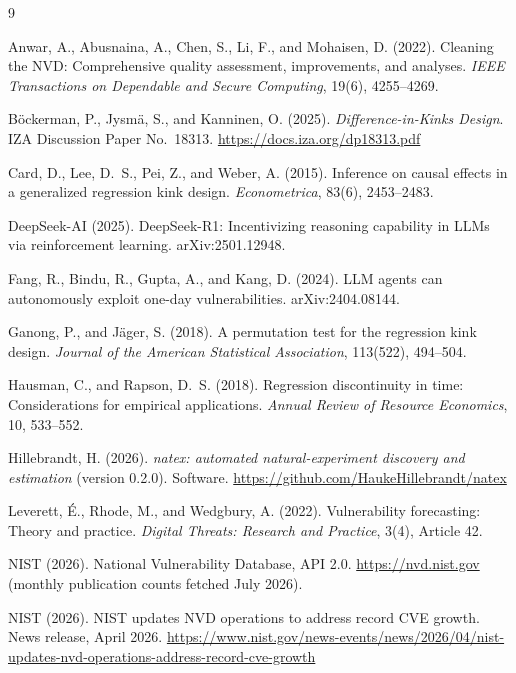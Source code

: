 \documentclass[11pt]{article}
\begin{document}
\footnotesize
\begin{thebibliography}{9}
\setlength{\itemsep}{2pt}\setlength{\parskip}{0pt}

Anwar, A., Abusnaina, A., Chen, S., Li, F., and Mohaisen, D. (2022).
Cleaning the NVD: Comprehensive quality assessment, improvements, and
analyses.
\emph{IEEE Transactions on Dependable and Secure Computing}, 19(6),
4255--4269.

B\"ockerman, P., Jysm\"a, S., and Kanninen, O. (2025).
\emph{Difference-in-Kinks Design}.
IZA Discussion Paper No.~18313.
\url{https://docs.iza.org/dp18313.pdf}

Card, D., Lee, D.~S., Pei, Z., and Weber, A. (2015).
Inference on causal effects in a generalized regression kink design.
\emph{Econometrica}, 83(6), 2453--2483.

DeepSeek-AI (2025).
DeepSeek-R1: Incentivizing reasoning capability in LLMs via reinforcement
learning.
arXiv:2501.12948.

Fang, R., Bindu, R., Gupta, A., and Kang, D. (2024).
LLM agents can autonomously exploit one-day vulnerabilities.
arXiv:2404.08144.

Ganong, P., and J\"ager, S. (2018).
A permutation test for the regression kink design.
\emph{Journal of the American Statistical Association}, 113(522), 494--504.

Hausman, C., and Rapson, D.~S. (2018).
Regression discontinuity in time: Considerations for empirical applications.
\emph{Annual Review of Resource Economics}, 10, 533--552.

Hillebrandt, H. (2026).
\emph{natex: automated natural-experiment discovery and estimation} (version
0.2.0). Software.
\url{https://github.com/HaukeHillebrandt/natex}

Leverett, \'E., Rhode, M., and Wedgbury, A. (2022).
Vulnerability forecasting: Theory and practice.
\emph{Digital Threats: Research and Practice}, 3(4), Article 42.

NIST (2026).
National Vulnerability Database, API 2.0.
\url{https://nvd.nist.gov} (monthly publication counts fetched July 2026).

NIST (2026).
NIST updates NVD operations to address record CVE growth.
News release, April 2026.
\url{https://www.nist.gov/news-events/news/2026/04/nist-updates-nvd-operations-address-record-cve-growth}

\end{thebibliography}
\end{document}

